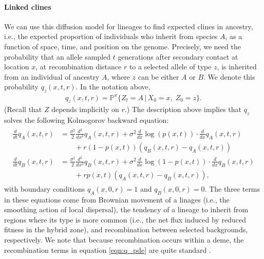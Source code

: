 \documentclass[11pt,letterpaper]{article}
\newcommand{\alisa}[1]{{\em \color{red} #1}}
\newcommand{\plr}[1]{{\em \color{blue} #1}}
\renewcommand{\P}{\mathbb{P}}
\newcommand{\grad}{\nabla}
\newcommand{\given}{\,\vert\,}
\begin{document}
\paragraph{Linked clines}
We can use this diffusion model for lineages to find expected clines in ancestry,
i.e., the expected proportion of individuals who inherit from species $A$,
as a function of space, time, and position on the genome.
Precisely, we need the probability that 
an allele sampled $t$ generations after secondary contact at location $x$,
at recombination distance $r$ to a selected allele of type $z$,
is inherited from an individual of ancestry $A$,
where $z$ can be either $A$ or $B$.
We denote this probability $q_z(x,t,r)$.
In the notation above,
\begin{align}
    q_z(x,t,r) = \P^x \{Z_t = A \given X_0 = x, \; Z_0 = z\} .
\end{align}
(Recall that $Z$ depends implicitly on $r$.) 
The description above implies that $q_z$ solves the following Kolmogorov backward equation:
\begin{align}
    \begin{aligned}  \label{eqn:q_pde}
    \frac{d}{dt} q_A(x,t,r) 
            &= 
                \frac{\sigma^2}{2} \frac{d^2}{dx^2} q_A(x,t,r) 
                + \sigma^2 \frac{d}{dx} \log(p(x,t)) \cdot \frac{d}{dx} q_A(x,t,r) 
            \\ &\qquad {} + 
                r (1-p(x,t))(q_B(x,t,r)-q_A(x,t,r))  \\
        \frac{d}{dt} q_B(x,t,r) 
            &= 
                \frac{\sigma^2}{2} \frac{d^2}{dx^2} q_B(x,t,r)
                + \sigma^2 \frac{d}{dx} \log(1-p(x,t)) \cdot \frac{d}{dx} q_B(x,t,r) 
            \\ &\qquad {} + 
            r p(x,t) (q_A(x,t,r)-q_B(x,t,r))  ,
    \end{aligned} 
\end{align}
with boundary conditions $q_A(x,0,r)=1$ and $q_B(x,0,r)=0$.
The three terms in these equations come from Brownian movement of a linages 
(i.e., the smoothing action of local dispersal),
the tendency of a lineage to inherit from regions where its type is more common 
(i.e., the net flux induced by reduced fitness in the hybrid zone),
and recombination between selected backgrounds, respectively.
We note that because recombination occurs within a deme, the recombination terms in equation \eqref{eqn:q_pde} are quite standard \citep{HartlClark}. 
\end{document}
